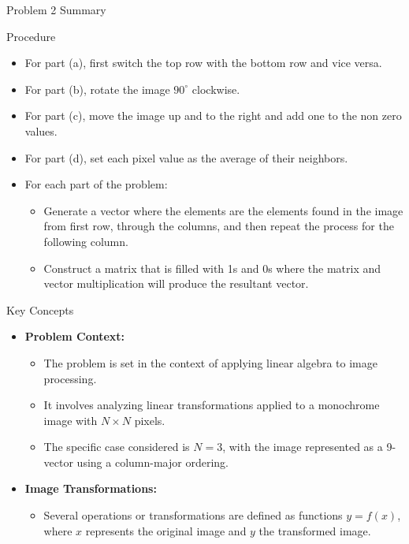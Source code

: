 \begin{summary}{Problem 2 Summary}
    \begin{statement}{Procedure}
        \begin{itemize}
            \item For part (a), first switch the top row with the bottom row and vice versa.
            \item For part (b), rotate the image $90^{\circ}$ clockwise.
            \item For part (c), move the image up and to the right and add one to the non zero values.
            \item For part (d), set each pixel value as the average of their neighbors.
            \item For each part of the problem:
            \begin{itemize}
                \item Generate a vector where the elements are the elements found in the image from first row, through the columns, and then repeat the process for the following column.
                \item Construct a matrix that is filled with 1s and 0s where the matrix and vector multiplication will produce the resultant vector.
            \end{itemize}
        \end{itemize}
    \end{statement}
    \begin{statement}{Key Concepts}
        \begin{itemize}
            \item \textbf{Problem Context:}
            \begin{itemize}
                \item The problem is set in the context of applying linear algebra to image processing.
                \item It involves analyzing linear transformations applied to a monochrome image with $N \times N$ pixels.
                \item The specific case considered is $N = 3$, with the image represented as a 9-vector using a column-major ordering.
            \end{itemize}
            \item \textbf{Image Transformations:}
            \begin{itemize}
                \item Several operations or transformations are defined as functions $y = f(x)$, where $x$ represents the original image and $y$ the transformed image.

\end{itemize}
\end{itemize}
\end{statement}
\end{summary}
